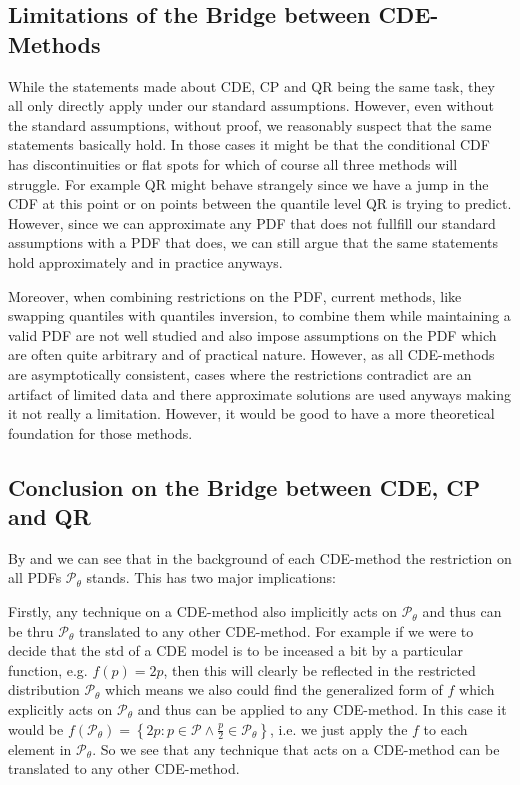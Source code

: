 \subsection{Limitations of the Bridge between CDE-Methods}

While the statements made about CDE, CP and QR being the same task, they all only directly apply under our standard assumptions. However, even without the standard assumptions, without proof, we reasonably suspect that the same statements basically hold. In those cases it might be that the conditional CDF has discontinuities or flat spots for which of course all three methods will struggle. For example QR might behave strangely since we have a jump in the CDF at this point or on points between the quantile level QR is trying to predict. However, since we can approximate any PDF that does not fullfill our standard assumptions with a PDF that does, we can still argue that the same statements hold approximately and in practice anyways.

Moreover, when combining restrictions on the PDF, current methods, like swapping quantiles with quantiles inversion, to combine them while maintaining a valid PDF are not well studied and also impose assumptions on the PDF which are often quite arbitrary and of practical nature. However, as all CDE-methods are asymptotically consistent, cases where the restrictions contradict are an artifact of limited data and there approximate solutions are used anyways making it not really a limitation. However, it would be good to have a more theoretical foundation for those methods.


\subsection{Conclusion on the Bridge between CDE, CP and QR}

By  and  we can see that in the background of each CDE-method the restriction on all PDFs $\mathcal{P}_\theta$ stands. This has two major implications:

Firstly, any technique on a CDE-method also implicitly acts on $\mathcal{P}_\theta$ and thus can be thru $\mathcal{P}_\theta$ translated to any other CDE-method. For example if we were to decide that the std of a CDE model is to be inceased a bit by a particular function, e.g. $f(p) = 2 p $, then this will clearly be reflected in the restricted distribution $\mathcal{P}_\theta$ which means we also could find the generalized form of $f$ which explicitly acts on $\mathcal{P}_\theta$ and thus can be applied to any CDE-method. In this case it would be $f(\mathcal{P}_{\theta}) = \left\{2 p: p \in \mathcal{P} \land \frac{p}{2} \in \mathcal{P}_\theta \right\}$, i.e. we just apply the $f$ to each element in $\mathcal{P}_\theta$. So we see that any technique that acts on a CDE-method can be translated to any other CDE-method.

